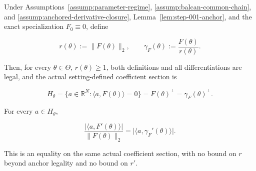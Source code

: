 \begin{lemma}
\label{lem:step-008-s2-radial-cancellation}

Under Assumptions~\ref{assump:parameter-regime}, \ref{assump:balcan-common-chain}, and
\ref{assump:anchored-derivative-closure}, Lemma~\ref{lem:step-001-anchor}, and the exact specialization \(F_0\equiv0\), define

\begin{equation}
\label{eq:appendix-display-215}
r(\theta):=\lVert F(\theta)\rVert_2,
\qquad
\gamma_F(\theta):=\frac{F(\theta)}{r(\theta)}.
\end{equation}

Then, for every \(\theta\in\Theta\), \(r(\theta)\geq1\), both definitions and all differentiations are legal,
and the actual setting-defined coefficient section is

\begin{equation}
\label{eq:appendix-display-216}
H_\theta
=\{a\in\mathbb R^N:\langle a,F(\theta)\rangle=0\}
=F(\theta)^\perp
=\gamma_F(\theta)^\perp.
\end{equation}

For every \(a\in H_\theta\),

\begin{equation}
\label{eq:appendix-display-217}
\frac{\lvert\langle a,F'(\theta)\rangle\rvert}
{\lVert F(\theta)\rVert_2}
=\lvert\langle a,\gamma_F'(\theta)\rangle\rvert.
\end{equation}

This is an equality on the same actual coefficient section, with no bound on \(r\) beyond anchor legality and no
bound on \(r'\).


\end{lemma}

